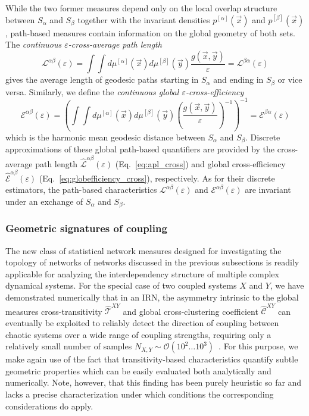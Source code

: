 While the two former measures depend only on the local overlap structure between $S_\alpha$ and $S_\beta$ together with the invariant densities $p^{[\alpha]}(\vec{x})$ and $p^{[\beta]}(\vec{x})$, path-based measures contain information on the global geometry of both sets. The \textit{continuous $\varepsilon$-cross-average path length}
\begin{equation}
\mathcal{L}^{\alpha\beta}(\varepsilon) = \int\!\!\!\int d\mu^{[\alpha]}(\vec{x}) d\mu^{[\beta]}(\vec{y}) \frac{g(\vec{x},\vec{y})}{\varepsilon} = \mathcal{L}^{\beta\alpha}(\varepsilon)
\end{equation}
gives the average length of geodesic paths starting in $S_\alpha$ and ending in $S_\beta$ or vice versa. Similarly, we define the \textit{continuous global $\varepsilon$-cross-efficiency}
\begin{equation}
\mathcal{E}^{\alpha\beta}(\varepsilon) = \left( \int\!\!\!\int d\mu^{[\alpha]}(\vec{x}) d\mu^{[\beta]}(\vec{y}) \left( \frac{g(\vec{x},\vec{y})}{\varepsilon} \right)^{-1} \right)^{-1} = \mathcal{E}^{\beta\alpha}(\varepsilon)
\end{equation}
which is the harmonic mean geodesic distance between $S_\alpha$ and $S_\beta$. Discrete approximations of these global path-based quantifiers are provided by the cross-average path length $\hat{\mathcal{L}}^{\alpha\beta}(\varepsilon)$ (Eq.~\ref{eq:apl_cross}) and global cross-efficiency $\hat{\mathcal{E}}^{\alpha\beta}(\varepsilon)$ (Eq.~\ref{eq:globefficiency_cross}), respectively. As for their discrete estimators, the path-based characteristics $\mathcal{L}^{\alpha\beta}(\varepsilon)$ and $\mathcal{E}^{\alpha\beta}(\varepsilon)$ are invariant under an exchange of $S_\alpha$ and $S_\beta$.


		\subsubsection{Geometric signatures of coupling}\label{sec:coupling}
		The new class of statistical network measures designed for investigating the topology of networks of networks discussed in the previous subsections is readily applicable for analyzing the interdependency structure of multiple complex dynamical systems. For the special case of two coupled systems $X$ and $Y$, we have demonstrated numerically that in an IRN, the asymmetry intrinsic to the global measures cross-transitivity $\hat{\mathcal{T}}^{XY}$ and global cross-clustering coefficient $\hat{\mathcal{C}}^{XY}$ can eventually be exploited to reliably detect the direction of coupling between chaotic systems over a wide range of coupling strengths, requiring only a relatively small number of samples $N_{X,Y}\sim\mathcal{O}(10^2\dots 10^3)$~\cite{Feldhoff2012}. For this purpose, we make again use of the fact that transitivity-based characteristics quantify subtle geometric properties which can be easily evaluated both analytically and numerically. Note, however, that this finding has been purely heuristic so far and lacks a precise characterization under which conditions the corresponding considerations do apply.

